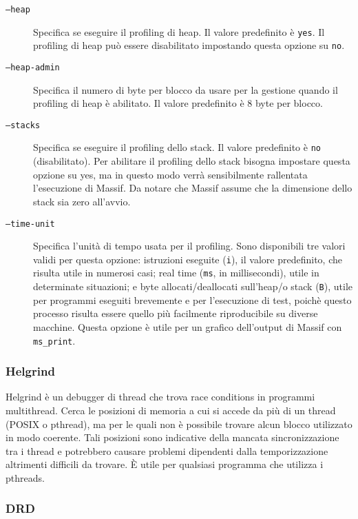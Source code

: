 \documentclass{article}
\begin{document}
\begin{description}
    \item[\texttt{--heap}] Specifica se eseguire il profiling di heap. Il valore predefinito è \texttt{yes}. Il profiling di heap può essere disabilitato impostando questa opzione su \texttt{no}. 
    \item[\texttt{--heap-admin}] Specifica il numero di byte per blocco da usare per la gestione quando il profiling di heap è abilitato. Il valore predefinito è 8 byte per blocco.
    \item[\texttt{--stacks}] Specifica se eseguire il profiling dello stack. Il
    valore predefinito è \texttt{no} (disabilitato). Per abilitare il profiling
    dello stack bisogna impostare questa opzione su yes, ma in questo modo verrà sensibilmente rallentata l'esecuzione di Massif. Da
    notare che Massif assume che la dimensione dello stack sia zero
    all'avvio.
    \item[\texttt{--time-unit}] Specifica l'unità di tempo usata per il profiling. Sono disponibili tre
    valori validi per questa opzione: istruzioni eseguite (\texttt{i}), il valore
    predefinito, che risulta utile in numerosi casi; real time (\texttt{ms}, in
    millisecondi), utile in determinate situazioni; e byte allocati/deallocati
    sull'heap/o stack (\texttt{B}), utile per programmi eseguiti brevemente e per
    l'esecuzione di test, poichè questo processo risulta essere quello più
    facilmente riproducibile su diverse macchine. Questa opzione è utile per un
    grafico dell'output di Massif con \texttt{ms\_print}. 
\end{description}


\subsubsection{Helgrind}

Helgrind è un debugger di thread che trova race conditions in programmi
multithread. Cerca le posizioni di memoria a cui si accede da più di un thread
(POSIX o pthread), ma per le quali non è possibile trovare alcun blocco
utilizzato in modo coerente. Tali posizioni sono indicative
della mancata sincronizzazione tra i thread e potrebbero causare problemi
dipendenti dalla temporizzazione altrimenti difficili da trovare. È utile per qualsiasi
programma che utilizza i pthreads.

\subsubsection{DRD}
\end{document}
